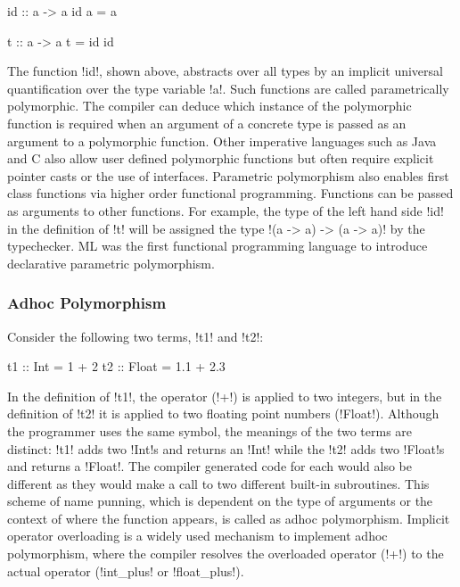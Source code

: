 \documentclass[screen,nonacm]{acmart}
\begin{document}
\begin{minipage}{0.5\linewidth}
\begin{code}
            id :: a -> a
            id a = a
\end{code}
\end{minipage}%
\begin{minipage}[ht]{0.5\linewidth}
\begin{code}
            t :: a -> a
            t = id id
\end{code}
\end{minipage}

The function !id!, shown above, abstracts over all types by an implicit universal
quantification over the type variable !a!. Such functions are called parametrically
polymorphic\cite{strachey_fundamental_2000}. The compiler can deduce which instance of the
polymorphic function is required when an argument of a concrete type is passed as an
argument to a polymorphic function. Other imperative languages such as Java and C also
allow user defined polymorphic functions but often require explicit pointer casts or the
use of interfaces. Parametric polymorphism also enables first class functions via higher
order functional programming. Functions can be passed as arguments to other functions. For
example, the type of the left hand side !id! in the definition of !t! will be assigned the
type !(a -> a) -> (a -> a)! by the typechecker. ML\cite{milner_logic_1975,
  milner_theory_1978} was the first functional programming language to introduce
declarative parametric polymorphism.


\subsubsection{Adhoc Polymorphism}
Consider the following two terms, !t1! and !t2!:

\begin{CenteredBox}
\begin{code}
t1 :: Int = 1 + 2
t2 :: Float = 1.1 + 2.3
\end{code}
\end{CenteredBox}
In the definition of !t1!, the operator (!+!) is applied to two integers, but in the
definition of !t2! it is applied to two floating point numbers (!Float!). Although the
programmer uses the same symbol, the meanings of the two terms are distinct: !t1! adds two
!Int!s and returns an !Int! while the !t2! adds two !Float!s and returns a !Float!. The
compiler generated code for each would also be different as they would make a call to two
different built-in subroutines. This scheme of name punning, which is dependent on the
type of arguments or the context of where the function appears, is called as adhoc
polymorphism\cite{strachey_fundamental_2000}. Implicit operator overloading is a widely
used mechanism to implement adhoc polymorphism, where the compiler resolves the overloaded
operator (!+!) to the actual operator (!int_plus! or !float_plus!).
\end{document}
